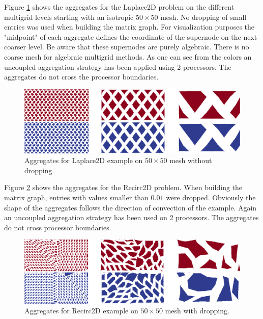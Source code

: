 \documentclass[12pt,a4paper]{article}
\begin{document}
Figure \ref{fig:symAggs} shows the aggregates for the Laplace2D problem on the different multigrid levels starting with an isotropic $50\times 50$ mesh. No dropping of small entries was used when building the matrix graph. For visualization purposes the "midpoint" of each aggregate defines the coordinate of the supernode on the next coarser level. Be aware that these supernodes are purely algebraic. There is no coarse mesh for algebraic multigrid methods. As one can see from the colors an uncoupled aggregation strategy has been applied using 2 processors. The aggregates do not cross the processor boundaries.

\begin{figure}
\includegraphics[width=\textwidth]{images/aggsSymm.png} 
\caption{Aggregates for Laplace2D example on $50\times 50$ mesh without dropping.}
\label{fig:symAggs}
\end{figure}

Figure \ref{fig:nonsymAggs} shows the aggregates for the Recirc2D problem. When building the matrix graph, entries with values smaller than $0.01$ were dropped. Obviously the shape of the aggregates follows the direction of convection of the example. Again an uncoupled aggregation strategy has been used on 2 processors. The aggregates do not cross processor boundaries.
\begin{figure}
\includegraphics[width=\textwidth]{images/aggsNonSymm.png} 
\caption{Aggregates for Recirc2D example on $50\times 50$ mesh with dropping.}
\label{fig:nonsymAggs}
\end{figure}
\end{document}
